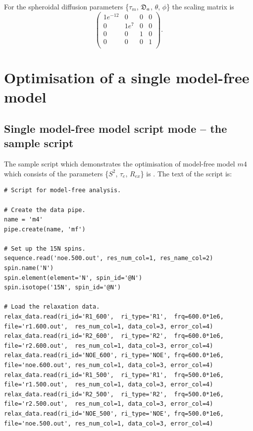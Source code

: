 \begin{htmlonly}
\begin{htmlonly}
\noindent  For the spheroidal diffusion parameters \{$\tau_m$, $\mathfrak{D}_a$, $\theta$, $\phi$\} the scaling matrix is
\begin{equation}
    \begin{pmatrix}
        1e^{-12} &  0 &  0 &  0 \\
        0 &  1e^7 &  0 &  0 \\
        0 &  0 &  1 &  0 \\
        0 &  0 &  0 &  1 \\
    \end{pmatrix}.
\end{equation}





\section{Optimisation of a single model-free model}\label{sect: single mf model}



\subsection{Single model-free model script mode -- the sample script}

The sample script which demonstrates the optimisation of model-free model $m4$ which consists of the parameters \{$S^2$, $\tau_e$, $R_{ex}$\} is .  The text of the script is:

\begin{lstlisting}
# Script for model-free analysis.

# Create the data pipe.
name = 'm4'
pipe.create(name, 'mf')

# Set up the 15N spins.
sequence.read('noe.500.out', res_num_col=1, res_name_col=2)
spin.name('N')
spin.element(element='N', spin_id='@N')
spin.isotope('15N', spin_id='@N')

# Load the relaxation data.
relax_data.read(ri_id='R1_600',  ri_type='R1',  frq=600.0*1e6, file='r1.600.out',  res_num_col=1, data_col=3, error_col=4)
relax_data.read(ri_id='R2_600',  ri_type='R2',  frq=600.0*1e6, file='r2.600.out',  res_num_col=1, data_col=3, error_col=4)
relax_data.read(ri_id='NOE_600', ri_type='NOE', frq=600.0*1e6, file='noe.600.out', res_num_col=1, data_col=3, error_col=4)
relax_data.read(ri_id='R1_500',  ri_type='R1',  frq=500.0*1e6, file='r1.500.out',  res_num_col=1, data_col=3, error_col=4)
relax_data.read(ri_id='R2_500',  ri_type='R2',  frq=500.0*1e6, file='r2.500.out',  res_num_col=1, data_col=3, error_col=4)
relax_data.read(ri_id='NOE_500', ri_type='NOE', frq=500.0*1e6, file='noe.500.out', res_num_col=1, data_col=3, error_col=4)


\end{lstlisting}
\end{htmlonly}
\end{htmlonly}
